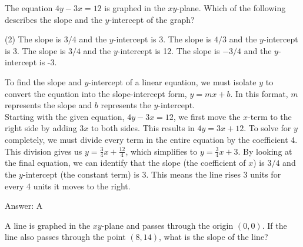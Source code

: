 \documentclass[11pt,paper=a4,answers]{exam}
\begin{document}
\begin{questions}
\pointsinrightmargin
\pointsdroppedatright
\marksnotpoints
{}
\pointformat{\boldmath\themarginpoints}
\bracketedpoints



\question
The equation $4y - 3x = 12$ is graphed in the $xy$-plane. Which of the following describes the slope and the $y$-intercept of the graph?
\begin{tasks}(2)
    \task The slope is $3/4$ and the $y$-intercept is 3.
    \task The slope is $4/3$ and the $y$-intercept is 3.
    \task The slope is $3/4$ and the $y$-intercept is 12.
    \task The slope is $-3/4$ and the $y$-intercept is -3.
\end{tasks}

\begin{solution}
To find the slope and $y$-intercept of a linear equation, we must isolate $y$ to convert the equation into the slope-intercept form, $y = mx + b$. In this format, $m$ represents the slope and $b$ represents the $y$-intercept.
\\[10pt]
Starting with the given equation, $4y - 3x = 12$, we first move the $x$-term to the right side by adding $3x$ to both sides. This results in $4y = 3x + 12$. To solve for $y$ completely, we must divide every term in the entire equation by the coefficient 4.
\\[10pt]
This division gives us $y = \frac{3}{4}x + \frac{12}{4}$, which simplifies to $y = \frac{3}{4}x + 3$. By looking at the final equation, we can identify that the slope (the coefficient of $x$) is $3/4$ and the $y$-intercept (the constant term) is 3. This means the line rises 3 units for every 4 units it moves to the right.

\vspace{15pt}
Answer: \colorbox{yellow!100}{A}
\end{solution}

\question
A line is graphed in the $xy$-plane and passes through the origin $(0, 0)$. If the line also passes through the point $(8, 14)$, what is the slope of the line?


\end{questions}
\end{document}

